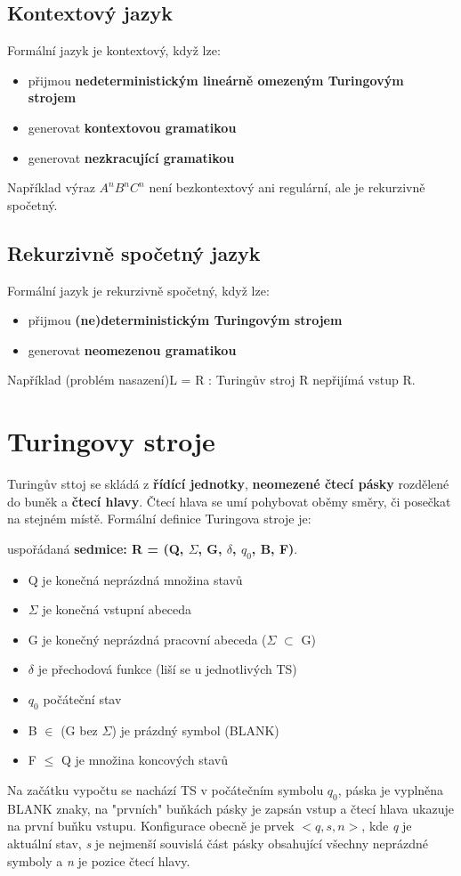 \documentclass{szzclass}
\begin{document}
\subsection{Kontextový jazyk}
Formální jazyk je kontextový, když lze:
\begin{itemize}
\item přijmou \textbf{nedeterministickým lineárně omezeným Turingovým strojem}
\item generovat \textbf{kontextovou gramatikou}
\item generovat \textbf{nezkracující gramatikou}
\end{itemize}
Například výraz $A^nB^nC^n$ není bezkontextový ani regulární, ale je rekurzivně spočetný.

\subsection{Rekurzivně spočetný jazyk}
Formální jazyk je rekurzivně spočetný, když lze:
\begin{itemize}
\item přijmou \textbf{(ne)deterministickým Turingovým strojem}
\item generovat \textbf{neomezenou gramatikou}
\end{itemize}
Například (problém nasazení)L = {R : Turingův stroj R nepřijímá vstup R}.

\section{Turingovy stroje}
Turingův sttoj se skládá z \textbf{řídící jednotky}, \textbf{neomezené čtecí pásky} rozdělené do buněk a \textbf{čtecí hlavy}.
Čtecí hlava se umí pohybovat oběmy směry, či posečkat na stejném místě.
\newline
Formální definice Turingova stroje je:

uspořádaná \textbf{sedmice: R = (Q, $\Sigma$, G, $\delta$, $q_0$, B, F)}.
\begin{itemize}
\item Q je konečná neprázdná množina stavů
\item $\Sigma$ je konečná vstupní abeceda
\item G je konečný neprázdná pracovní abeceda ($\Sigma$ $\subset$ G)
\item $\delta$ je přechodová funkce (liší se u jednotlivých TS)
\item $q_0$ počáteční stav
\item B $\in$ (G bez $\Sigma$) je prázdný symbol (BLANK)
\item F $\leq$ Q je množina koncových stavů
\end{itemize}
Na začátku vypočtu se nachází TS v počátečním symbolu $q_0$, páska je vyplněna BLANK znaky, na "prvních" buňkách pásky je zapsán vstup a čtecí hlava ukazuje na první buňku vstupu.
\newline
Konfigurace obecně je prvek $<q,s,n>$, kde \textit{q} je aktuální stav, \textit{s} je nejmenší souvislá část pásky obsahující všechny neprázdné symboly a \textit{n} je pozice čtecí hlavy.
\end{document}
